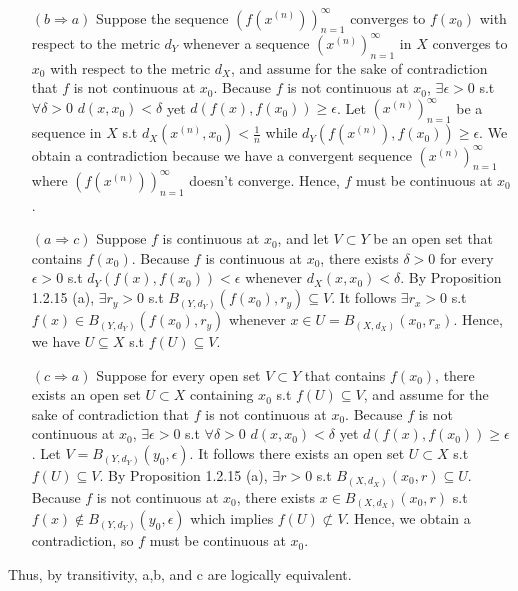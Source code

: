 \documentclass[10pt]{article}
\begin{document}
\begin{enumerate}[label=Problem \arabic*.]
\begin{itemize}
        \item [$(b\Rightarrow a)$] Suppose the sequence $(f(x^{(n)}))_{n=1}^{\infty}$ converges to $f(x_0)$ with respect to the metric $d_Y$ whenever a sequence $(x^{(n)})_{n=1}^{\infty}$ in $X$ converges to $x_0$ with respect to the metric $d_X$, and assume for the sake of contradiction that $f$ is not continuous at $x_0$.
        Because $f$ is not continuous at $x_0$, $\exists\epsilon>0$ s.t $\forall\delta>0$ $d(x,x_0)<\delta$ yet $d(f(x),f(x_0))\ge\epsilon$.
        Let $(x^{(n)})_{n=1}^{\infty}$ be a sequence in $X$ s.t $d_X(x^{(n)},x_0)<\frac{1}{n}$ while $d_Y(f(x^{(n)}),f(x_0))\ge\epsilon$.
        We obtain a contradiction because we have a convergent sequence $(x^{(n)})_{n=1}^{\infty}$ where $(f(x^{(n)}))_{n=1}^{\infty}$ doesn't converge.
        Hence, $f$ must be continuous at $x_0$.
       
        \item [$(a\Rightarrow c)$] Suppose $f$ is continuous at $x_0$, and let $V\subset Y$ be an open set that contains $f(x_0)$. 
        Because $f$ is continuous at $x_0$, there exists $\delta>0$ for every $\epsilon>0$ s.t $d_Y(f(x),f(x_0))<\epsilon$ whenever $d_X(x,x_0)<\delta$. 
        By Proposition 1.2.15 (a), $\exists r_y>0$ s.t $B_{(Y,d_Y)}(f(x_0),r_y)\subseteq V$.
        It follows $\exists r_x>0$ s.t $f(x)\in B_{(Y,d_Y)}(f(x_0),r_y)$ whenever $x\in U=B_{(X,d_X)}(x_0,r_x)$.
        Hence, we have $U\subseteq X$ s.t $f(U)\subseteq V$.

        \item [$(c\Rightarrow a)$] Suppose for every open set $V\subset Y$ that contains $f(x_0)$, there exists an open set $U\subset X$ containing $x_0$ s.t $f(U)\subseteq V$, and assume for the sake of contradiction that $f$ is not continuous at $x_0$.
        Because $f$ is not continuous at $x_0$, $\exists\epsilon>0$ s.t $\forall\delta>0$ $d(x,x_0)<\delta$ yet $d(f(x),f(x_0))\ge\epsilon$.
        Let $V=B_{(Y,d_Y)}(y_0,\epsilon)$. It follows there exists an open set $U\subset X$ s.t $f(U)\subseteq V$.
        By Proposition 1.2.15 (a), $\exists r>0$ s.t $B_{(X,d_X)}(x_0,r)\subseteq U$. 
        Because $f$ is not continuous at $x_0$, there exists $x\in B_{(X,d_X)}(x_0,r)$ s.t $f(x)\notin B_{(Y,d_Y)}(y_0,\epsilon)$ which implies $f(U)\not\subset V$. Hence, we obtain a contradiction, so $f$ must be continuous at $x_0$.
    \end{itemize}
    Thus, by transitivity, a,b, and c are logically equivalent.


\end{enumerate}
\end{document}
